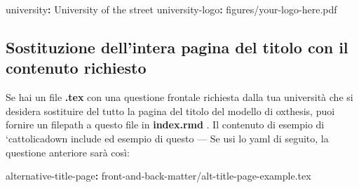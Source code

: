 \documentclass[a4paper, 11pt, nobind]{templates/ociamthesis}
\newenvironment{Shaded}{\begin{snugshade}}{\end{snugshade}}
\newcommand{\AttributeTok}[1]{\textcolor[rgb]{0.77,0.63,0.00}{#1}}
\newcommand{\FunctionTok}[1]{\textcolor[rgb]{0.00,0.00,0.00}{#1}}
\newcommand{\KeywordTok}[1]{\textcolor[rgb]{0.13,0.29,0.53}{\textbf{#1}}}
\renewenvironment{Shaded}
{
  \vspace{10pt}%
  \begin{snugshade}%
}{%
  \end{snugshade}%
  \vspace{8pt}%
}
\begin{document}
\begin{Shaded}
\begin{Highlighting}[]
\FunctionTok{university}\KeywordTok{:}\AttributeTok{ University of the street}
\FunctionTok{university{-}logo}\KeywordTok{:}\AttributeTok{ figures/your{-}logo{-}here.pdf}
\end{Highlighting}
\end{Shaded}

\hypertarget{sostituzione-dellintera-pagina-del-titolo-con-il-contenuto-richiesto}{%
\subsection{Sostituzione dell'intera pagina del titolo con il contenuto richiesto}\label{sostituzione-dellintera-pagina-del-titolo-con-il-contenuto-richiesto}}

Se hai un file \textbf{.tex } con una questione frontale richiesta dalla tua università che si desidera sostituire del tutto la pagina del titolo del modello di oxthesis, puoi fornire un filepath a questo file in \textbf{index.rmd }.
Il contenuto di esempio di `cattolicadown include ed esempio di questo --- Se usi lo yaml di seguito, la questione anteriore sarà così:

\begin{Shaded}
\begin{Highlighting}[]
\FunctionTok{alternative{-}title{-}page}\KeywordTok{:}\AttributeTok{ front{-}and{-}back{-}matter/alt{-}title{-}page{-}example.tex}
\end{Highlighting}
\end{Shaded}
\end{document}
